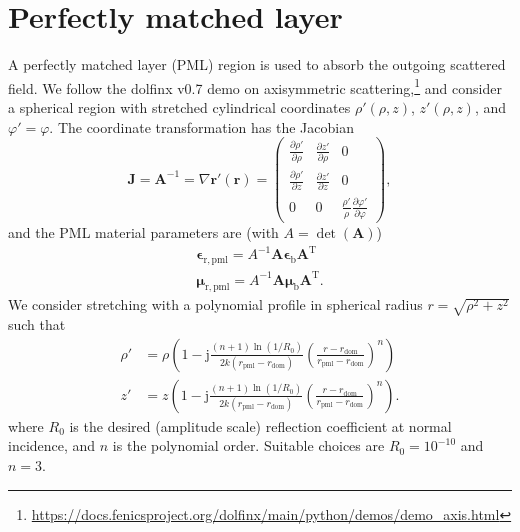 \documentclass[a4paper,12pt]{article}
\renewcommand{\vec}[1]{\boldsymbol{#1}}
\newcommand{\mrm}[1]{\mathrm{#1}}
\newcommand{\mat}[1]{\mathbf{#1}}
\newcommand{\ju}{\mrm{j}}
\newcommand{\rv}{\vec{r}}
\newcommand{\epsm}{\boldsymbol{\epsilon}}
\newcommand{\mum}{\boldsymbol{\mu}}
\begin{document}
\appendix


\section{Perfectly matched layer}
\label{app:pml}

A perfectly matched layer (PML) region is used to absorb the outgoing
scattered field. We follow the dolfinx v0.7 demo on axisymmetric
scattering,\footnote{\url{https://docs.fenicsproject.org/dolfinx/main/python/demos/demo_axis.html}}
and consider a spherical region with stretched cylindrical coordinates
$\rho'(\rho,z)$, $z'(\rho,z)$, and $\varphi'=\varphi$. The coordinate
transformation has the Jacobian
\begin{equation}
  \mat{J} = \mat{A}^{-1} = \nabla\rv'(\rv) =
  \begin{pmatrix}
    \frac{\partial\rho'}{\partial\rho} & \frac{\partial z'}{\partial\rho} & 0 \\
    \frac{\partial\rho'}{\partial z} & \frac{\partial z'}{\partial z} & 0 \\
    0 & 0 & \frac{\rho'}{\rho}\frac{\partial\varphi'}{\partial\varphi}
  \end{pmatrix},
\end{equation}
and the PML material parameters are (with
$A=\operatorname{det}(\mat{A})$) 
\begin{align}
  \epsm_{\mrm{r,pml}} = A^{-1} \mat{A} \boldsymbol{\epsilon}_{\mrm{b}} \mat{A}^{\mrm{T}} \\
  \mum_{\mrm{r,pml}} = A^{-1} \mat{A} \boldsymbol{\mu}_{\mrm{b}} \mat{A}^{\mrm{T}}.
\end{align}
We consider stretching with a polynomial profile in spherical radius
$r=\sqrt{\rho^{2}+z^{2}}$ such that \cite[p. 663]{Taflove+etal2004}
\begin{align}
  \rho' &= \rho\left( 1 - \ju \frac{(n+1)\ln(1/R_{0})}{2k(r_{\mrm{pml}} - r_{\mrm{dom}})} \left(\frac{r-r_{\mrm{dom}}}{r_{\mrm{pml}} - r_{\mrm{dom}}}\right)^{n}\right) \\
  z' &= z\left( 1 - \ju \frac{(n+1)\ln(1/R_{0})}{2k(r_{\mrm{pml}} - r_{\mrm{dom}})} \left(\frac{r-r_{\mrm{dom}}}{r_{\mrm{pml}} - r_{\mrm{dom}}}\right)^{n}\right). 
\end{align}
where $R_{0}$ is the desired (amplitude scale) reflection coefficient
at normal incidence, and $n$ is the polynomial order. Suitable choices
are $R_{0} = 10^{-10}$ and $n=3$.
\end{document}
